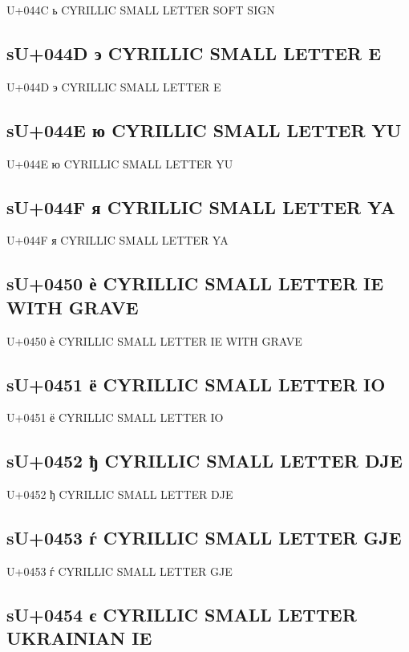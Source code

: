 U+044C ь  CYRILLIC SMALL LETTER SOFT SIGN

\subsection{sU+044D э  CYRILLIC SMALL LETTER E}

U+044D э  CYRILLIC SMALL LETTER E

\subsection{sU+044E ю  CYRILLIC SMALL LETTER YU}

U+044E ю  CYRILLIC SMALL LETTER YU

\subsection{sU+044F я  CYRILLIC SMALL LETTER YA}

U+044F я  CYRILLIC SMALL LETTER YA

\subsection{sU+0450 ѐ  CYRILLIC SMALL LETTER IE WITH GRAVE}

U+0450 ѐ  CYRILLIC SMALL LETTER IE WITH GRAVE

\subsection{sU+0451 ё  CYRILLIC SMALL LETTER IO}

U+0451 ё  CYRILLIC SMALL LETTER IO

\subsection{sU+0452 ђ  CYRILLIC SMALL LETTER DJE}

U+0452 ђ  CYRILLIC SMALL LETTER DJE

\subsection{sU+0453 ѓ  CYRILLIC SMALL LETTER GJE}

U+0453 ѓ  CYRILLIC SMALL LETTER GJE

\subsection{sU+0454 є  CYRILLIC SMALL LETTER UKRAINIAN IE}

